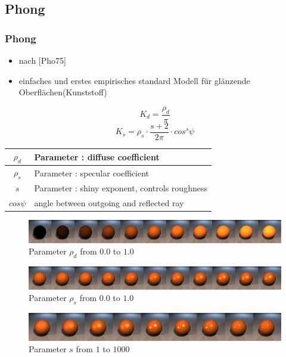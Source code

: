 \documentclass[11pt]{beamer}
\begin{document}
\subsection{Phong}
\begin{frame}[allowframebreaks]
\frametitle{Phong}

\begin{itemize}
\item nach [Pho75]
\item einfaches und erstes empirisches standard Modell für glänzende Oberflächen(Kunststoff)
\end{itemize}


\begin{equation}
K_d = \frac{\rho_d}{\pi}
\end{equation}
\begin{equation}
K_s = \rho_s \cdot \frac{s+2}{2\pi} \cdot cos^s\psi
\end{equation}

\begin{table}[H]
\begin{tabular}{| c | l |}
\hline
$\rho_d$ & Parameter : diffuse coefficient\\ \hline
$\rho_s$ & Parameter : specular coefficient\\ \hline
$s$ & Parameter : shiny exponent, controls roughness\\ \hline
$cos\psi$ & angle between outgoing and reflected ray\\ \hline
\end{tabular}
\end{table}

\framebreak
\begin{figure}[H]
\includegraphics[width=\textwidth]{../phongdiffcomplete}
\caption{Parameter $\rho_d$ from $0.0$ to $1.0$}
\end{figure}

\begin{figure}[H]
\includegraphics[width=\textwidth]{../phongspeccomplete}
\caption{Parameter $\rho_s$ from $0.0$ to $1.0$}
\end{figure}

\begin{figure}[H]
\includegraphics[width=\textwidth]{../phongshinecomplete}
\caption{Parameter $s$ from $1$ to $1000$}
\end{figure}


\end{frame}
\end{document}

